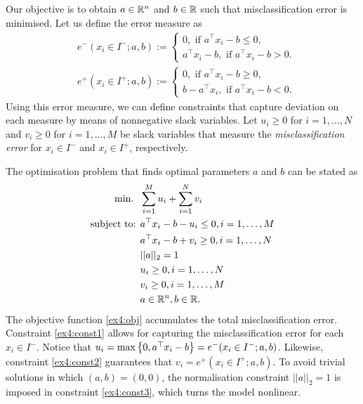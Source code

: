 \documentclass{article}
\begin{document}
Our objective is to obtain $a \in \mathbb R^n$ and $b \in \mathbb R$ such that misclassification error is minimised. Let us define the error measure as
%
\begin{align*}
& e^-(x_i \in I^-; a, b) := 
    \begin{cases} 0, \text{ if } a^\top x_i - b \leq 0, \\
        a^\top x_i - b, \text{ if } a^\top x_i - b > 0.
    \end{cases} \\
& e^+(x_i \in I^+; a, b) := 
    \begin{cases} 0, \text{ if } a^\top x_i - b \geq 0, \\
        b -  a^\top x_i, \text{ if } a^\top x_i - b < 0.
    \end{cases}                   
\end{align*}
%
Using this error measure, we can define constraints that capture deviation on each measure by means of nonnegative slack variables. Let $u_i \geq 0$ for $i = 1, \dots, N$ and $v_i \geq 0$ for $i = 1,\dots, M$ be slack variables that measure the \emph{misclassification error} for $x_i \in I^-$ and $x_i \in I^+$, respectively.

The optimisation problem that finds optimal parameters $a$ and $b$ can be stated as
%
\begin{align}
\mathop{\text{min.} \ } \ & \sum_{i=1}^M u_i + \sum_{i=1}^N v_i \label{ex4:obj}\\
\mbox{subject to: } & a^\top x_i - b - u_i \leq 0, i = 1, \dots, M \label{ex4:const1} \\
    & a^\top x_i - b + v_i \geq 0, i = 1,\dots,N \label{ex4:const2} \\
    & ||a||_2 = 1 \label{ex4:const3} \\
    & u_i \geq 0, i = 1, \dots, N \\
    & v_i \geq 0, i = 1, \dots, M \\
    & a \in \mathbb R^n, b \in \mathbb R. \label{ex4:end}   
\end{align} 
%
The objective function \eqref{ex4:obj} accumulates the total misclassification error. Constraint \eqref{ex4:const1} allows for capturing the misclassification error for each $x_i \in I^-$. Notice that $u_i = \max\left\{ 0, a^\top x_i -b \right \} = e^-(x_i \in I^-; a, b)$. Likewise, constraint \eqref{ex4:const2} guarantees that $v_i = e^+(x_i \in I^+; a, b)$.
To avoid trivial solutions in which $(a,b) = (0, 0)$, the normalisation constraint $|| a ||_2 = 1$ is imposed in constraint \eqref{ex4:const3}, which turns the model nonlinear.
\end{document}
